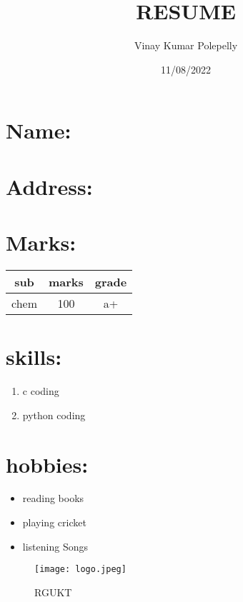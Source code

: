 \documentclass{article}
\title{RESUME}
\author{Vinay Kumar Polepelly}
\date{11/08/2022}
\begin{document}
\maketitle
\section{\bf{Name}:
}
\section{Address:
\it{\color{red}{telangana}}}
\section{Marks:}
\begin{center}
    \begin{tabular}{|c|c|c|}
    \hline
         sub&marks&grade\\
         \hline
         chem&100&a+\\
         \hline
    \end{tabular}
\end{center}
\section{skills:}
\begin{enumerate}
    \item c coding
    \item python coding
\end{enumerate}
\section{hobbies:}
\begin{itemize}
    \item reading books
    \item playing cricket
    \item listening Songs
\end{itemize}
\begin{figure}
    \centering
    \texttt{[image: logo.jpeg]}
    \caption{RGUKT}
    \label{fig:my_label}
\end{figure}
\end{document}
